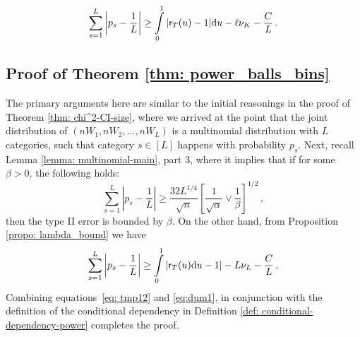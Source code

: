 \documentclass[11pt]{article}
\begin{document}
\[
\sum\limits_{s=1}^{L}\left|p_s-\frac{1}{L} \right|\geq 
\int\limits_{0}^{1}|\mathsf{r}_{T}(u)-1|{\rm d} u-\ell\nu_K-\frac{C}{L}\,.
\]

\subsection{Proof of Theorem \ref{thm: power_balls_bins}}\label{proof:thm: power_balls_bins}

The primary arguments here are similar to the initial reasonings in the proof of Theorem \ref{thm: chi^2-CI-size}, where we arrived at the point that the joint distribution of $(nW_1,nW_2,...,nW_{L})$ is a multinomial distribution with $L$ categories, such that category $s\in[L]$ happens with probability $p_s$. Next, recall Lemma \ref{lemma: multinomial-main}, part 3, where it implies that if for some $\beta>0$, the following holds:
%
\begin{equation}\label{eq: tmp12}
\sum\limits_{s=1}^{L}\left|p_s-\frac{1}{L}\right| \geq\frac{32{L^{1/4}}}{\sqrt{n}}\left[\frac{1}{\sqrt{\alpha}}\vee\frac{1}{\beta}  \right]^{1/2}\,,
\end{equation}
then the type II error is bounded by $\beta$. On the other hand, from Proposition \ref{propo: lambda_bound} we have
\begin{align}\label{eq:dum1}
\sum\limits_{s=1}^{L} \left| p_s-\frac{1}{L}\right| \geq 
\int\limits_{0}^{1}|\mathsf{r}_T(u){\rm d} u-1|-L \nu_L-\frac{C}{L}\,.
\end{align}
Combining equations~\eqref{eq: tmp12} and \eqref{eq:dum1},  in conjunction with the definition of the conditional dependency in Definition \ref{def: conditional-dependency-power} completes the proof.







\end{document}
